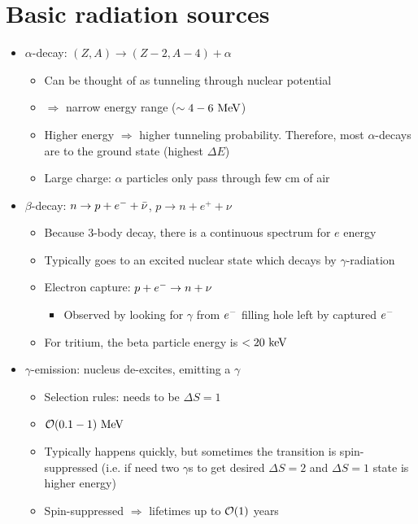 \section{Basic radiation sources}
\begin{itemize}
  \item $\alpha$-decay: $(Z,A)\rightarrow(Z-2,A-4)+\alpha$
  \begin{itemize}
    \item Can be thought of as tunneling through nuclear potential
    \item $\Rightarrow$ narrow energy range ($\sim4-6~\text{MeV}$)
    \item Higher energy $\Rightarrow$ higher tunneling probability. Therefore, most $\alpha$-decays are to the ground state (highest $\Delta E$)
    \item Large charge: $\alpha$ particles only pass through few cm of air
  \end{itemize}
  \item $\beta$-decay: $n\rightarrow p+e^- + {\bar{\nu}}$, $p\rightarrow n+e^+ + \nu$
  \begin{itemize}
    \item Because $3$-body decay, there is a continuous spectrum for $e$ energy
    \item Typically goes to an excited nuclear state which decays by $\gamma$-radiation
    \item Electron capture: $p+e^{-}\rightarrow n+\nu$
    \begin{itemize}
      \item Observed by looking for $\gamma$ from $e^{-}$ filling hole left by captured $e^{-}$
    \end{itemize}
    \item For tritium, the beta particle energy is $<20~\text{keV}$
  \end{itemize}
  \item $\gamma$-emission: nucleus de-excites, emitting a $\gamma$
  \begin{itemize}
    \item Selection rules: needs to be $\Delta S = 1$
    \item $\mathcal{O}(0.1-1)~\text{MeV}$
    \item Typically happens quickly, but sometimes the transition is spin-suppressed (i.e. if need two $\gamma$s to get desired $\Delta S=2$ and $\Delta S=1$ state is higher energy)
    \item Spin-suppressed $\Rightarrow$ lifetimes up to $\mathcal{O}(1) $ years
  \end{itemize}

\end{itemize}
